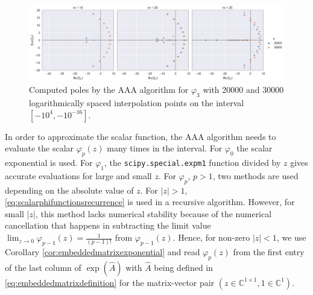 \begin{figure}[h]
    \centering
    \includegraphics[width=.9\textwidth]{img/AAA/poles_ms_log_p03.png}
    \caption{
        Computed poles by the AAA algorithm for $\varphi_3$ with 20000 and 30000
        logarithmically spaced interpolation points on the interval $[-10^{4}, -10^{-16}]$.
    }
    \label{fig:polesAAAms}
\end{figure}

\begin{remark}
    In order to approximate the scalar function, the AAA algorithm needs to evaluate the scalar
    $\varphi_p(z)$ many times in the interval.
    For $\varphi_0$ the scalar exponential is used. For $\varphi_1$, the \texttt{scipy.special.expm1}
    function divided by $z$ gives accurate evaluations for large and small $z$.
    For $\varphi_p$, $p > 1$, two methods are used depending on the absolute value of $z$.
    For $|z| > 1$, \eqref{eq:scalarphifunctionsrecurrence} is used in a recursive algorithm.
    However, for small $|z|$, this method lacks numerical stability because of the numerical
    cancellation that happens in subtracting the limit value
    $\lim_{z \to 0}\varphi_{p-1}(z) = \frac{1}{(p-1)!}$ from $\varphi_{p-1}(z)$.
    Hence, for non-zero $|z| < 1$, we use Corollary \ref{cor:embeddedmatrixexponential} and read $\varphi_p(z)$
    from the first entry of the last column of $\exp(\hat{A})$ with $\hat{A}$ being defined in
    \eqref{eq:embeddedmatrixdefinition} for the matrix-vector pair
    $(z \in \mathbb{C}^{1 \times 1}, 1 \in \mathbb{C}^{1})$.
\end{remark}

\FloatBarrier

